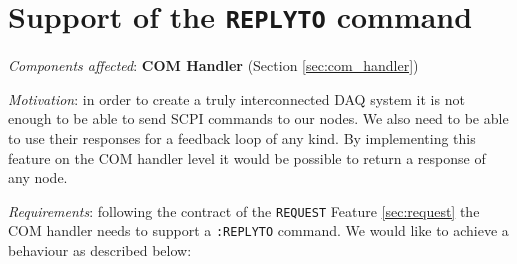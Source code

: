 \section{Support of the \texttt{REPLYTO} command}
\label{sec:replyto}

\textit{Components affected}: \textbf{COM Handler} (Section \ref{sec:com_handler})

\textit{Motivation}: in order to create a truly interconnected DAQ system it is not enough to be able to send SCPI commands to our nodes. We also need to be able to use their responses for a feedback loop of any kind. By implementing this feature on the COM handler level it  would be possible to return a response of any node.

\textit{Requirements}: following the contract of the \texttt{REQUEST} Feature \ref{sec:request} the COM handler needs to support a \texttt{:REPLYTO} command. We would like to achieve a behaviour as described below:

